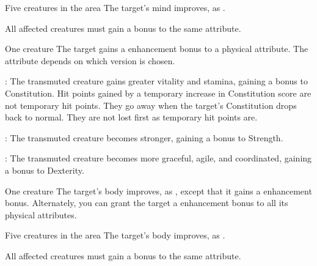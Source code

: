 \begin{spelltargets}{Five creatures in the area}
    \spelleffect The target's mind improves, as . 
\end{spelltargets}
\spellnotes All affected creatures must gain a bonus to the same attribute.

\spellrng{\rngtouch}
\spelldur{\durshort}
\begin{spelltarget}{One creature}
    \spelleffect The target gains a  enhancement bonus to a physical attribute. The attribute depends on which version is chosen.
    \par {}: The transmuted creature gains greater vitality and stamina, gaining a bonus to Constitution. Hit points gained by a temporary increase in Constitution score are not temporary hit points. They go away when the target's Constitution drops back to normal. They are not lost first as temporary hit points are.
    \par {}: The transmuted creature becomes stronger, gaining a bonus to Strength.
    \par {}: The transmuted creature becomes more graceful, agile, and coordinated, gaining a bonus to Dexterity.
\end{spelltarget}

\spellrng{\rngtouch}
\spelldur{\durshort}
\begin{spelltarget}{One creature}
    \spelleffect The target's body improves, as , except that it gains a  enhancement bonus. Alternately, you can grant the target a  enhancement bonus to all its physical attributes.
\end{spelltarget}

\begin{spelltargets}{Five creatures in the area}
    \spelleffect The target's body improves, as . 
\end{spelltargets}
\spellnotes All affected creatures must gain a bonus to the same attribute.

